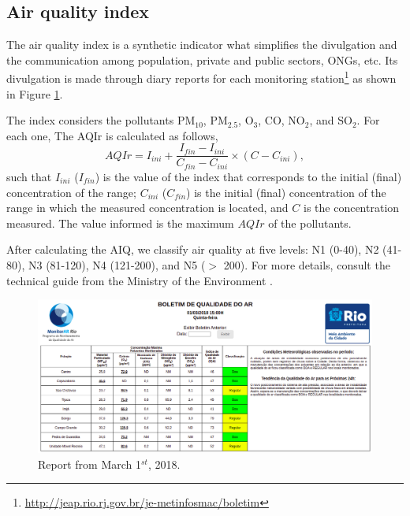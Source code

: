\subsection{Air quality index}

The air quality index is a synthetic indicator what simplifies the divulgation
and the communication among population, private and public sectors, ONGs, etc.
Its divulgation is made through diary reports for each monitoring
station\footnote{\url{http://jeap.rio.rj.gov.br/je-metinfosmac/boletim}} as
shown in Figure \ref{fig:boletim}. 

The index considers the pollutants PM$_{10}$, PM$_{2.5}$, O$_3$,
CO, NO$_2$, and SO$_2$. For each one, The AQIr is calculated as follows,
\begin{equation}
    \label{eq:AQI}
    AQIr = I_{ini} + \frac{I_{fin} - I_{ini}}{C_{fin} - C_{ini}} \times (C - C_{ini}), 
\end{equation}
such that $I_{ini}$ ($I_{fin}$) is the value of the index that corresponds to
the initial (final) concentration of the range; $C_{ini}$ ($C_{fin}$) is the
initial (final) concentration of the range in which the measured concentration
is located, and $C$ is the concentration measured. The value informed is the
maximum $AQIr$ of the pollutants. 

After calculating the AIQ, we classify air quality at five levels: N1 (0-40),
N2 (41-80), N3 (81-120), N4 (121-200), and N5 ($>$ 200). For more details,
consult the technical guide from the Ministry of the Environment \cite{guia-tecnico-mma}. 

\begin{figure}[!ht]  
    \includegraphics[width=\linewidth]{../images/boletim01-03-2018.png}
    \caption{Report from March 1$^{st}$, 2018.}
    \label{fig:boletim}
\end{figure}



